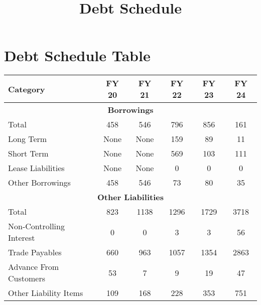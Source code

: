 \documentclass{article}
\begin{document}
\title{\textbf{Debt Schedule}}
\date{}
\maketitle

\section*{Debt Schedule Table}

\begin{tabularx}{\textwidth}{|X|c|c|c|c|c|}
    \hline
    \rowcolor{blue!20}
    \textbf{Category} & \textbf{FY 20} & \textbf{FY 21} & \textbf{FY 22} & \textbf{FY 23} & \textbf{FY 24} \\
    \hline
    \multicolumn{6}{|c|}{\textbf{Borrowings}} \\
    \hline
    Total & 458 & 546 & 796 & 856 & 161 \\
    \hline
    Long Term & None & None & 159 & 89 & 11 \\
    \hline
    Short Term & None & None & 569 & 103 & 111 \\
    \hline
    Lease Liabilities & None & None & 0 & 0 & 0 \\
    \hline
    Other Borrowings & 458 & 546 & 73 & 80 & 35 \\
    \hline
    \multicolumn{6}{|c|}{\textbf{Other Liabilities}} \\
    \hline
    Total & 823 & 1138 & 1296 & 1729 & 3718 \\
    \hline
    Non-Controlling Interest & 0 & 0 & 3 & 3 & 56 \\
    \hline
    Trade Payables & 660 & 963 & 1057 & 1354 & 2863 \\
    \hline
    Advance From Customers & 53 & 7 & 9 & 19 & 47 \\
    \hline
    Other Liability Items & 109 & 168 & 228 & 353 & 751 \\
    \hline
\end{tabularx}
\end{document}
